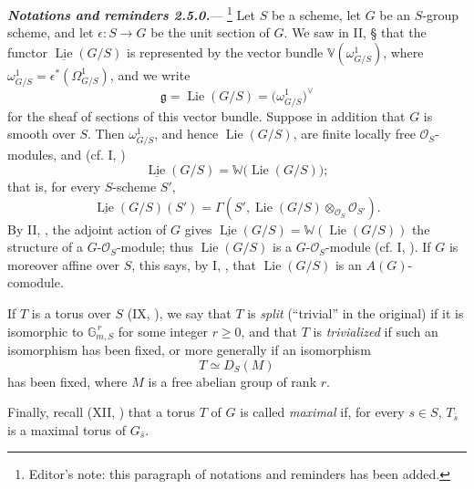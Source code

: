 
\par\medskip\noindent
\textbf{\textit{Notations and reminders 2.5.0.}}---%
\footnote{Editor's note: this paragraph of notations and reminders has
been added.}
Let \(S\) be a scheme, let \(G\) be an \(S\)-group scheme, and let
\(\epsilon\colon S\to G\) be the unit section of \(G\).  We saw in
II, § that the functor
\(\underline{\operatorname{Lie}}(G/S)\) is represented by the vector
bundle
\(\mathbb V(\omega^1_{G/S})\), where
\(\omega^1_{G/S}=\epsilon^{*}(\Omega^1_{G/S})\), and we write
\[
  \mathfrak g
  =
  \operatorname{Lie}(G/S)
  =
  \bigl(\omega^1_{G/S}\bigr)^{\vee}
\]
for the sheaf of sections of this vector bundle.  Suppose in addition
that \(G\) is smooth over \(S\).  Then \(\omega^1_{G/S}\), and hence
\(\operatorname{Lie}(G/S)\), are finite locally free
\(\mathcal O_S\)-modules, and (cf. I, )
\[
  \underline{\operatorname{Lie}}(G/S)
  =
  \mathbb W\bigl(\operatorname{Lie}(G/S)\bigr);
\]
that is, for every \(S\)-scheme \(S'\),
\[
  \underline{\operatorname{Lie}}(G/S)(S')
  =
  \Gamma\!\left(
    S',
    \operatorname{Lie}(G/S)\otimes_{\mathcal O_S}\mathcal O_{S'}
  \right).
\]
By II, , the adjoint action of \(G\) gives
\(\underline{\operatorname{Lie}}(G/S)
=\mathbb W(\operatorname{Lie}(G/S))\) the structure of a
\(G\)-\(\mathcal O_S\)-module; thus
\(\operatorname{Lie}(G/S)\) is a \(G\)-\(\mathcal O_S\)-module
(cf. I, ).  If \(G\) is moreover affine over \(S\), this says,
by I, , that \(\operatorname{Lie}(G/S)\) is an
\(A(G)\)-comodule.

If \(T\) is a torus over \(S\) (IX, ), we say that \(T\)
is \emph{split} (``trivial'' in the original) if it is isomorphic to
\(\mathbb G_{m,S}^{\,r}\) for some integer \(r\geq 0\), and that \(T\)
is \emph{trivialized} if such an isomorphism has been fixed, or more
generally if an isomorphism
\[
  T\simeq D_S(M)
\]
has been fixed, where \(M\) is a free abelian group of rank \(r\).

Finally, recall (XII, ) that a torus \(T\) of \(G\) is
called \emph{maximal} if, for every \(s\in S\), \(T_{\bar s}\) is a
maximal torus of \(G_{\bar s}\).

